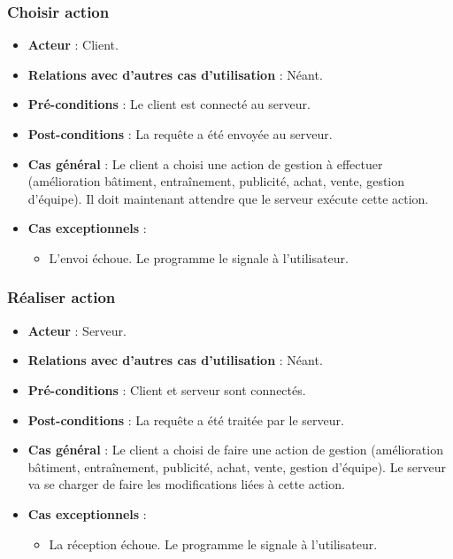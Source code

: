 \documentclass[a4paper,titlepage]{scrreprt}
\begin{document}
    \subsubsection{Choisir action}
      \begin{itemize}
        \item \textbf{Acteur}  : Client.
        \item \textbf{Relations avec d'autres cas d'utilisation}  : Néant.
        \item \textbf{Pré-conditions} : Le client est connecté au serveur.
        \item \textbf{Post-conditions} : La requête a été envoyée au serveur.
        \item \textbf{Cas général} : Le client a choisi une action de gestion à effectuer (amélioration bâtiment, entraînement, publicité, achat, vente, gestion d’équipe). Il doit maintenant attendre que le serveur exécute cette action.
        \item \textbf{Cas exceptionnels} : 
        \begin{itemize}
            \item L'envoi échoue. Le programme le signale à l'utilisateur.
          \end{itemize}
      \end{itemize}
    \subsubsection{Réaliser action}
      \begin{itemize}
        \item \textbf{Acteur}  : Serveur.
        \item \textbf{Relations avec d'autres cas d'utilisation}  : Néant.
        \item \textbf{Pré-conditions} : Client et serveur sont connectés.
        \item \textbf{Post-conditions} : La requête a été traitée par le serveur.
        \item \textbf{Cas général} : Le client a choisi de faire une action de gestion (amélioration bâtiment, entraînement, publicité, achat, vente, gestion d’équipe). Le serveur va se charger de faire les modifications liées à cette action.
        \item \textbf{Cas exceptionnels} :
        \begin{itemize}
            \item La réception échoue. Le programme le signale à l'utilisateur.
          \end{itemize} 
      \end{itemize}
\end{document}
